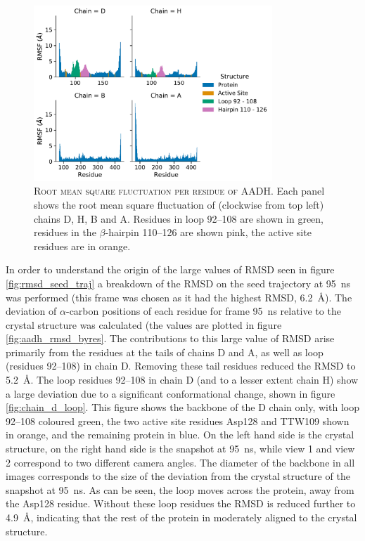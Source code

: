 \begin{figure}
 \centering
 \caption[Root mean square fluctuation per residue of AADH]{\textsc{Root mean square fluctuation per residue of AADH}. Each panel shows the root mean square fluctuation of (clockwise from top left) chains D, H, B and A. Residues in loop \numrange[range-phrase=\text{--}]{92}{108} are shown in green, residues in the $\beta$-hairpin \numrange[range-phrase=\text{--}]{110}{126} are shown pink, the active site residues are in orange.}
 \label{fig:rmsf_per_residue}
 \includegraphics[width=0.8\textwidth]{chapters/aadh/figures/RMSF_by_residue.pdf}
\end{figure}


In order to understand the origin of the large values of RMSD seen in figure \ref{fig:rmsd_seed_traj} a breakdown of the RMSD on the seed trajectory at \SI{95}{\nano\second} was performed (this frame was chosen as it had the highest RMSD, \SI{6.2}{\angstrom}). The deviation of  $\alpha$-carbon positions of each residue for  frame \SI{95}{\nano\second} relative to the crystal structure was calculated (the values are plotted in figure \ref{fig:aadh_rmsd_byres}. The contributions to this large value of RMSD arise primarily from the residues at the tails of chains D and A, as well as loop (residues \numrange[range-phrase=\text{--}]{92}{108}) in chain D. Removing these tail residues reduced the RMSD to \SI{5.2}{\angstrom}. The loop residues \numrange[range-phrase=\text{--}]{92}{108} in chain D (and to a lesser extent chain H) show a large deviation due to a significant conformational change, shown in figure \ref{fig:chain_d_loop}. This figure shows the backbone of the D chain only, with loop \numrange[range-phrase=\text{--}]{92}{108} coloured green, the two active site residues Asp128 and TTW109 shown in orange, and the remaining protein in blue. On the left hand side is the crystal structure, on the right hand side is the snapshot at \SI{95}{\nano\second}, while view 1 and view 2 correspond to two different camera angles. The diameter of the backbone in all images corresponds to the  size of the deviation from the crystal structure of the snapshot at \SI{95}{\nano\second}. As can be seen, the loop moves across the protein, away from the Asp128 residue. Without these loop residues the RMSD is reduced further to \SI{4.9}{\angstrom}, indicating that the rest of the protein in moderately aligned to the crystal structure. 

